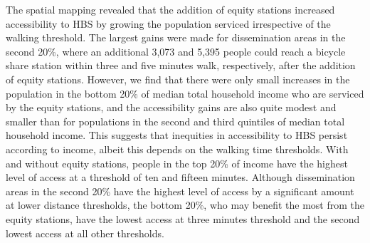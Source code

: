 \documentclass[]{elsarticle} %
\begin{document}
The spatial mapping revealed that the addition of equity stations
increased accessibility to HBS by growing the population serviced
irrespective of the walking threshold. The largest gains were made for
dissemination areas in the second 20\%, where an additional 3,073 and
5,395 people could reach a bicycle share station within three and five
minutes walk, respectively, after the addition of equity stations.
However, we find that there were only small increases in the population
in the bottom 20\% of median total household income who are serviced by
the equity stations, and the accessibility gains are also quite modest
and smaller than for populations in the second and third quintiles of
median total household income. This suggests that inequities in
accessibility to HBS persist according to income, albeit this depends on
the walking time thresholds. With and without equity stations, people in
the top 20\% of income have the highest level of access at a threshold
of ten and fifteen minutes. Although dissemination areas in the second
20\% have the highest level of access by a significant amount at lower
distance thresholds, the bottom 20\%, who may benefit the most from the
equity stations, have the lowest access at three minutes threshold and
the second lowest access at all other thresholds.
\end{document}
